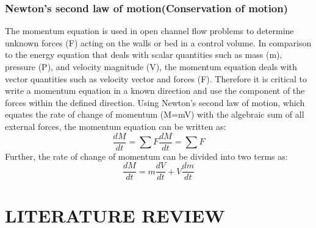 \documentclass[a4paper,12pt]{report}
\begin{document}
{\subsection{Newton's second law of motion(Conservation of motion)}
The momentum equation is used in open channel flow problems to determine unknown forces (F) acting on the walls or bed in a control volume. In comparison to the energy equation that deals with scalar quantities such as mass (m), pressure (P), and velocity magnitude (V), the momentum equation deals with vector quantities such as velocity vector and forces (F). Therefore it is critical to write a momentum equation in a known direction and use the component of the forces within the defined direction. Using Newton’s second law of motion, which equates the rate of change of momentum (M=mV) with the algebraic sum of all external forces, the momentum equation can be written as:
$$\frac{dM}{dt} = \sum F \frac{dM}{dt}= \sum F$$
Further, the rate of change of momentum can be divided into two terms as:
$$\frac{dM}{dt} =m\frac{dV}{dt} +V\frac{dm}{dt}$$
\chapter{LITERATURE REVIEW}
}
\end{document}
